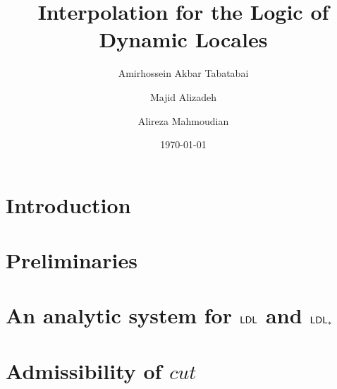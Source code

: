 \documentclass[10pt,a4paper]{amsart}
\begin{document}
\title{Interpolation for the Logic of Dynamic Locales}
\author{Amirhossein Akbar Tabatabai}


\author{Majid Alizadeh}

\author{Alireza Mahmoudian}

\date{\today}
 
\begin{abstract}
	
\end{abstract}

\maketitle



\section{Introduction}


\section{Preliminaries}


\section{An analytic system for $\mathsf{LDL}$ and $\mathsf{LDL}_*$}


\section{Admissibility of $cut$}




\end{document}

